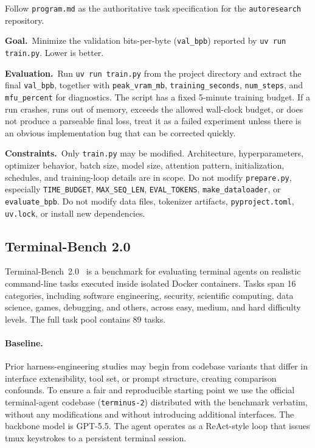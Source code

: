 \documentclass{llmxive}
\begin{document}
\begin{promptbox}[title=\textbf{Architecture Design Task Instruction}]
Follow \texttt{program.md} as the authoritative task specification for the
\texttt{autoresearch} repository.

\smallskip
\noindent\textbf{Goal.}~Minimize the validation bits-per-byte
(\texttt{val\_bpb}) reported by \texttt{uv run train.py}.
Lower is better.

\smallskip
\noindent\textbf{Evaluation.}~Run \texttt{uv run train.py} from the project
directory and extract the final \texttt{val\_bpb}, together with
\texttt{peak\_vram\_mb}, \texttt{training\_seconds}, \texttt{num\_steps},
and \texttt{mfu\_percent} for diagnostics.
The script has a fixed 5-minute training budget.
If a run crashes, runs out of memory, exceeds the allowed wall-clock budget, or
does not produce a parseable final loss, treat it as a failed experiment unless
there is an obvious implementation bug that can be corrected quickly.

\smallskip
\noindent\textbf{Constraints.}~Only \texttt{train.py} may be modified.
Architecture, hyperparameters, optimizer behavior, batch size, model size,
attention pattern, initialization, schedules, and training-loop details are in
scope.
Do not modify \texttt{prepare.py}, especially \texttt{TIME\_BUDGET},
\texttt{MAX\_SEQ\_LEN}, \texttt{EVAL\_TOKENS}, \texttt{make\_dataloader}, or
\texttt{evaluate\_bpb}.
Do not modify data files, tokenizer artifacts, \texttt{pyproject.toml},
\texttt{uv.lock}, or install new dependencies.
\end{promptbox}

\subsection{Terminal-Bench 2.0}
\label{app:benchmark-terminal-bench}

Terminal-Bench~2.0~\citep{terminalbench} is a benchmark for evaluating
terminal agents on realistic command-line tasks executed inside isolated
Docker containers.
Tasks span 16 categories, including software engineering, security,
scientific computing, data science, games, debugging, and others, across
easy, medium, and hard difficulty levels.
The full task pool contains 89 tasks.

\paragraph{Baseline.}
Prior harness-engineering studies may begin from codebase variants that
differ in interface extensibility, tool set, or prompt structure, creating
comparison confounds.
To ensure a fair and reproducible starting point we use the official
terminal-agent codebase (\texttt{terminus-2}) distributed with the
benchmark verbatim, without any modifications and without introducing
additional interfaces.
The backbone model is GPT-5.5.
The agent operates as a ReAct-style loop that issues tmux keystrokes to
a persistent terminal session.
\end{document}
